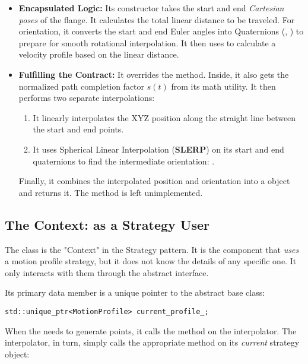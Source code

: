 \begin{itemize}
    \item \textbf{Encapsulated Logic:} Its constructor takes the start and end \textit{Cartesian poses} of the flange. It calculates the total linear distance to be traveled. For orientation, it converts the start and end Euler angles into Quaternions (, ) to prepare for smooth rotational interpolation. It then uses  to calculate a velocity profile based on the linear distance.
    \item \textbf{Fulfilling the Contract:} It overrides the  method. Inside, it also gets the normalized path completion factor \(s(t)\) from its math utility. It then performs two separate interpolations:
    \begin{enumerate}
        \item It linearly interpolates the XYZ position along the straight line between the start and end points.
        \item It uses Spherical Linear Interpolation (\textbf{SLERP}) on its start and end quaternions to find the intermediate orientation: .
    \end{enumerate}
    Finally, it combines the interpolated position and orientation into a  object and returns it. The  method is left unimplemented.
\end{itemize}


\subsection{The Context:  as a Strategy User}
\label{subsec:interpolator_context}

The  class is the "Context" in the Strategy pattern. It is the component that \textit{uses} a motion profile strategy, but it does not know the details of any specific one. It only interacts with them through the abstract  interface.

Its primary data member is a unique pointer to the abstract base class:
\begin{verbatim}
std::unique_ptr<MotionProfile> current_profile_;
\end{verbatim}

When the  needs to generate points, it calls the  method on the interpolator. The interpolator, in turn, simply calls the appropriate method on its \textit{current} strategy object:

